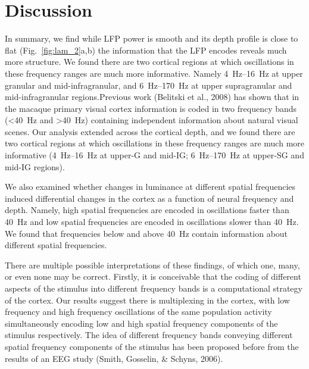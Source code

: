 \section{Discussion}
In summary, we find while \ac{LFP} power is smooth and its depth profile is close to flat (Fig.~\ref{fig:lam_2}a,b) the information that the \ac{LFP} encodes reveals much more structure.
We found there are two cortical regions at which oscillations in these frequency ranges are much more informative.
Namely \SIrange{4}{16}{Hz} at upper granular and mid-infragranular, and \SIrange{6}{170}{Hz} at upper supragranular and mid{}-infragranular regions.Previous work (Belitski et al., 2008) has shown that in the macaque primary visual cortex information is coded in two frequency bands (\SI{<40}{Hz} and \SI{>40}{Hz}) containing independent information about natural visual scenes.
Our analysis extended across the cortical depth, and we found there are two cortical regions at which oscillations in these frequency ranges are much more informative (\SIrange{4}{16}{Hz} at upper-\ac{G} and mid-\ac{IG}; \SIrange{6}{170}{Hz} at upper-\ac{SG} and mid-\ac{IG} regions).

We also examined whether changes in luminance at different spatial frequencies induced differential changes in the cortex as a function of neural frequency and depth.
Namely, high spatial frequencies are encoded in oscillations faster than \SI{40}{Hz} and low spatial frequencies are encoded in oscillations slower than \SI{40}{Hz}.
We found that frequencies below and above \SI{40}{Hz} contain information about different spatial frequencies.

There are multiple possible interpretations of these findings, of which one, many, or even none may be correct.
Firstly, it is conceivable that the coding of different aspects of the stimulus into different frequency bands is a computational strategy of the cortex.
Our results suggest there is multiplexing in the cortex, with low frequency and high frequency oscillations of the same population activity simultaneously encoding low and high spatial frequency components of the stimulus respectively.
The idea of different frequency bands conveying different spatial frequency components of the stimulus has been proposed before from the results of an \ac{EEG} study (Smith, Gosselin, \& Schyns, 2006).

